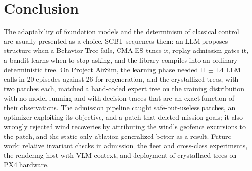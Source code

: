 \documentclass[conference]{IEEEtran}
\begin{document}
\section{Conclusion}
\label{sec:conclusion}
The adaptability of foundation models and the determinism of classical control are usually presented as a choice. SCBT sequences them: an LLM proposes structure when a Behavior Tree fails, CMA-ES tunes it, replay admission gates it, a bandit learns when to stop asking, and the library compiles into an ordinary deterministic tree. On Project AirSim, the learning phase needed $11\pm1.4$ LLM calls in 20 episodes against 26 for regeneration, and the crystallized trees, with two patches each, matched a hand-coded expert tree on the training distribution with no model running and with decision traces that are an exact function of their observations. The admission pipeline caught safe-but-useless patches, an optimizer exploiting its objective, and a patch that deleted mission goals; it also wrongly rejected wind recoveries by attributing the wind's geofence excursions to the patch, and the static-only ablation generalized better as a result. Future work: relative invariant checks in admission, the fleet and cross-class experiments, the rendering host with VLM context, and deployment of crystallized trees on PX4 hardware.

\end{document}
